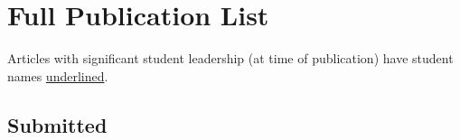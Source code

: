 \documentclass[11pt,letterpaper,sans]{moderncv}
\begin{document}

\section{Full Publication List} %

Articles with significant student leadership (at time of publication) have student names \underline{underlined}.

\subsection{Submitted} \vspace{-0.3cm}
\end{document}

